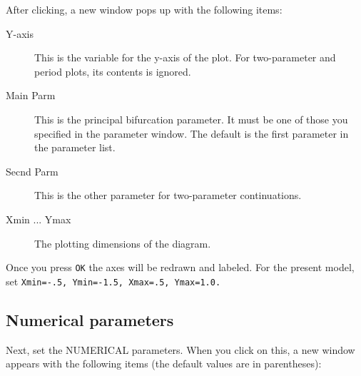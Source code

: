 \documentclass{article}
\begin{document}
After clicking, a new window pops up with the following items:
\begin{description}
\item[Y-axis] This is the variable for the y-axis of the plot.  For
two-parameter and period plots, its contents is ignored.
\item[Main Parm] This is the principal bifurcation parameter.  It must
be one of those you specified in the parameter window.  The default is
the first parameter in the parameter list.
\item[Secnd Parm] This is the other parameter for two-parameter
continuations.
\item[Xmin ... Ymax] The plotting dimensions of the diagram.
\end{description}

Once you press {\tt OK} the axes will be redrawn and labeled.
For the present model, set {\tt Xmin=-.5, Ymin=-1.5, Xmax=.5,
Ymax=1.0.}

\subsection{Numerical parameters}

Next, set the NUMERICAL parameters.  When you click on this, a new
window appears with the following items (the default values are in
parentheses):
\end{document}
